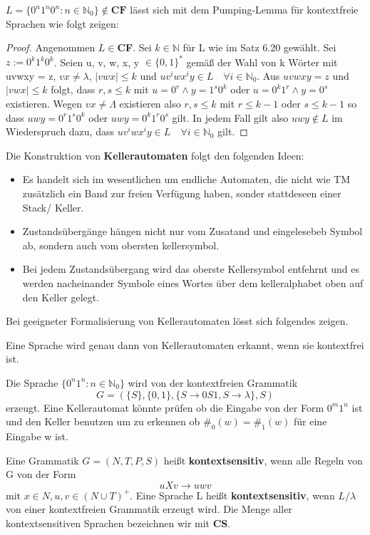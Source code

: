     \(L = \{0^n 1^n 0^n : n\in \mathbb{N}_0\} \not \in \textbf{CF}\) lässt sich mit dem Pumping-Lemma für kontextfreie Sprachen wie folgt zeigen:
    \begin{proof}
        Angenommen \(L \in \)\textbf{CF}. Sei \(k \in \mathbb{N}\) für L wie im Satz 6.20 gewählt. Sei \(z:=0^k1^k0^k\). Seien u, v, w, x, y \(\in \{0, 1\}^*\) gemäß der Wahl von k Wörter mit uvwxy = z, \(vx \not = \lambda\), \(|vwx| \leq k\) und \(uv^iwx^iy \in L \quad \forall i \in \mathbb{N}_0\). Aus \(uvwxy = z\) und \(|vwx| \leq k\) folgt, dass \(r, s \leq k\) mit \(u = 0^r \wedge y = 1^s0^k\) oder \(u = 0^k 1^r \wedge y = 0^s\) existieren. Wegen \(vx \not = \Lambda\) existieren also \(r, s \leq k\) mit \(r \leq k - 1\) oder \(s \leq k -1\) so dass \(uwy = 0^r1^s0^k\) oder \(uwy = 0^k1^r0^s\) gilt. In jedem Fall gilt also \(uwy \not \in L\) im Wiederspruch dazu, dass \(uv^iwx^iy \in L \quad \forall i \in \mathbb{N}_0\) gilt.
    \end{proof}

Die Konstruktion von \textbf{Kellerautomaten} folgt den folgenden Ideen:
\begin{itemize}
    \item Es handelt sich im wesentlichen um endliche Automaten, die nicht wie TM zusätzlich ein Band zur freien Verfügung haben, sonder stattdeseen einer Stack/ Keller.
    \item Zustandsübergänge hängen nicht nur vom Zusatand und eingelesebeb Symbol ab, sondern auch vom obersten kellersymbol.
    \item Bei jedem Zustandsübergang wird das oberste Kellersymbol entfehrnt und es werden nacheinander Symbole eines Wortes über dem kelleralphabet oben auf den Keller gelegt.
\end{itemize}
Bei geeigneter Formalisierung von Kellerautomaten lösst sich folgendes zeigen.

    Eine Sprache wird genau dann von Kellerautomaten erkannt, wenn sie kontextfrei ist.

    Die Sprache \(\{0^n1^n : n\in \mathbb{N}_0\}\) wird von der kontextfreien Grammatik 
    \[
        G = (\{S\}, \{0, 1\}, \{S \to 0S1, S \to \lambda\}, S)
    \] 
    erzeugt. Eine Kellerautomat könnte prüfen ob die Eingabe von der Form \(0^m 1^n\) ist und den Keller benutzen um zu erkennen ob \(\#_0(w) = \#_1(w)\) für eine Eingabe w ist.
    
    Eine Grammatik \(G = (N, T, P, S)\) heißt \textbf{kontextsensitiv}, wenn alle Regeln von G von der Form 
    \[
        uXv \to uwv    
    \]
    mit \(x \in N, u,v \in (N \cup T)^+\). Eine Sprache L heißt \textbf{kontextsensitiv}, wenn \(L/{\lambda}\) von einer kontextfreien Grammatik erzeugt wird. Die Menge aller kontextsensitiven Sprachen bezeichnen wir mit \textbf{CS}.
    
